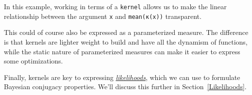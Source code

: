 \documentclass{juliacon}
\newcommand{\chad}[2][] {\todo[inline,backgroundcolor=orange!20!white, size=\footnotesize,#1]{(Chad) #2 }}
\newcommand{\moritz}[2][] {\todo[inline,backgroundcolor=blue!10!white, size=\footnotesize,#1]{(Moritz) #2 }}
\begin{document}
In this example, working in terms of a \verb|kernel| allows us to make the linear relationship between the argument \verb|x| and \verb|mean(κ(x))| transparent. 

This could of course also be expressed as a parameterized measure. The difference is that kernels are lighter weight to build and have all the dynamism of functions, while the static nature of parameterized measures can make it easier to express some optimizations.


Finally, kernels are key to expressing \href{https://en.wikipedia.org/wiki/Likelihood_function}{\emph{likelihoods}}, which we can use to formulate Bayesian conjugacy properties. We'll discuss this further in Section~\ref{Likelihoods}.






\end{document}
